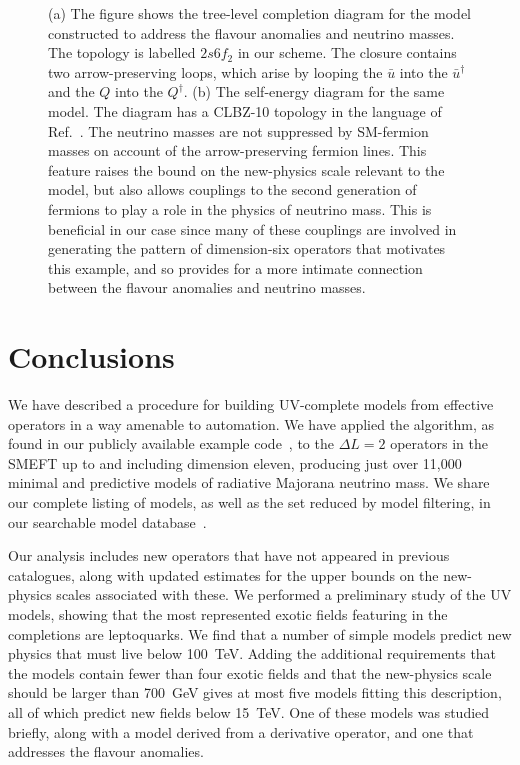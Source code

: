 \begin{figure}[t]
  \centering
  \caption{(a) The figure shows the tree-level completion diagram for the model
    constructed to address the flavour anomalies and neutrino masses. The
    topology is labelled $2s6f_{2}$ in our scheme. The closure contains two
    arrow-preserving loops, which arise by looping the $\bar{u}$ into the
    $\bar{u}^{\dagger}$ and the $Q$ into the $Q^{\dagger}$. (b) The self-energy
    diagram for the same model. The diagram has a CLBZ-10 topology in the
    language of Ref.~\cite{Sierra:2014rxa}. The neutrino masses are not
    suppressed by SM-fermion masses on account of the arrow-preserving fermion
    lines. This feature raises the bound on the new-physics scale relevant to
    the model, but also allows couplings to the second generation of fermions to
    play a role in the physics of neutrino mass. This is beneficial in our case
    since many of these couplings are involved in generating the pattern of
    dimension-six operators that motivates this example, and so provides for a
    more intimate connection between the flavour anomalies and neutrino masses.}
  \label{fig:flavour-anomalies-model-diagrams}
\end{figure}


\section{Conclusions}
\label{sec:conclusions}

We have described a procedure for building UV-complete models from effective
operators in a way amenable to automation. We have applied the algorithm, as
found in our publicly available example code~\cite{neutrinomass2020}, to the
$\Delta L = 2$ operators in the SMEFT up to and including dimension eleven,
producing just over 11,000 minimal and predictive models of radiative Majorana
neutrino mass. We share our complete listing of models, as well as the set
reduced by model filtering, in our searchable model
database~\cite{gargalionis_john_2020_4054618}.

Our analysis includes new operators that have not appeared in previous
catalogues, along with updated estimates for the upper bounds on the new-physics
scales associated with these. We performed a preliminary study of the UV models,
showing that the most represented exotic fields featuring in the completions are
leptoquarks. We find that a number of simple models predict new physics that
must live below \SI{100}{\TeV}. Adding the additional requirements that the
models contain fewer than four exotic fields and that the new-physics scale
should be larger than \SI{700}{\GeV} gives at most five models fitting this
description, all of which predict new fields below \SI{15}{\TeV}. One of these
models was studied briefly, along with a model derived from a derivative
operator, and one that addresses the flavour anomalies.

